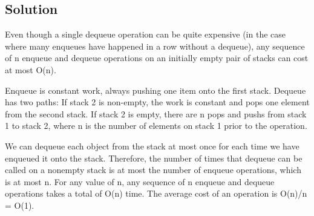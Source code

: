 \subsection*{Solution}

Even though a single dequeue operation can be quite expensive (in the case where many enqueues have happened in a row without a dequeue), any sequence of n enqueue and dequeue operations on an initially empty pair of stacks can cost at most O(n). 

Enqueue is constant work, always pushing one item onto the first stack.
Dequeue has two paths:
  If stack 2 is non-empty, the work is constant and pops one element from the second stack.
  If stack 2 is empty, there are n pops and pushs from stack 1 to stack 2, where n is the number of elements on stack 1 prior to the operation.

We can dequeue each object from the stack at most once for each time we have enqueued it onto the stack. Therefore, the number of times that dequeue can be called on a nonempty stack is at most the number of enqueue operations, which is at most n. For any value of n, any sequence of n enqueue and dequeue operations takes a total of O(n) time. The average cost of an operation is O(n)/n = O(1).
